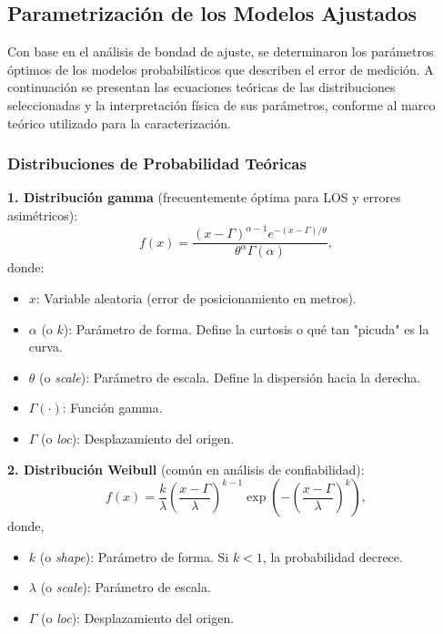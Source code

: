 \subsection{Parametrización de los Modelos Ajustados}
\label{sec:parametrizacion_modelos}

Con base en el análisis de bondad de ajuste, se determinaron los parámetros óptimos de los modelos probabilísticos que describen el error de medición. A continuación se presentan las ecuaciones teóricas de las distribuciones seleccionadas y la interpretación física de sus parámetros, conforme al marco teórico utilizado para la caracterización.

\subsubsection{Distribuciones de Probabilidad Teóricas}

\textbf{1. Distribución gamma} (frecuentemente óptima para LOS y errores asimétricos):
%
\begin{equation}
f(x) = \frac{(x-\Gamma)^{\alpha-1} e^{-(x-\Gamma)/\theta}}{\theta^\alpha \Gamma(\alpha)},
\end{equation}
%
donde:
%
\begin{itemize}
    \item $x$: Variable aleatoria (error de posicionamiento en metros).
    \item $\alpha$ (o $k$): Parámetro de forma. Define la curtosis o qué tan "picuda" es la curva.
    \item $\theta$ (o \textit{scale}): Parámetro de escala. Define la dispersión hacia la derecha.
    \item $\Gamma (\cdot)$: Función gamma.
    \item $\Gamma$ (o \textit{loc}): Desplazamiento del origen.
\end{itemize}

\textbf{2. Distribución Weibull} (común en análisis de confiabilidad):
%
\begin{equation}
f(x) = \frac{k}{\lambda} \left(\frac{x-\Gamma}{\lambda}\right)^{k-1} \exp\left(-\left(\frac{x-\Gamma}{\lambda}\right)^k\right),
\end{equation}
%
donde,
%
\begin{itemize}
    \item $k$ (o \textit{shape}): Parámetro de forma. Si $k < 1$, la probabilidad decrece.
    \item $\lambda$ (o \textit{scale}): Parámetro de escala.
    \item $\Gamma$ (o \textit{loc}): Desplazamiento del origen.
\end{itemize}

